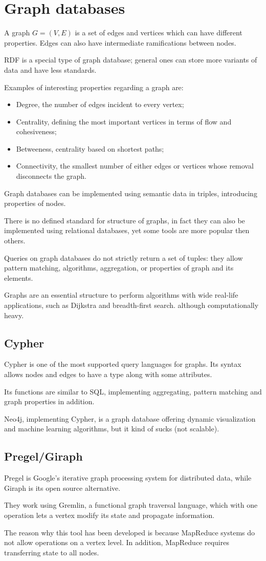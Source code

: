 \section{Graph databases}
A graph $G = (V, E)$ is a set of edges and vertices which can have different properties. Edges can also have intermediate ramifications between nodes.

RDF is a special type of graph database; general ones can store more variants of data and have less standards.

Examples of interesting properties regarding a graph are:
\begin{itemize}
	\item Degree, the number of edges incident to every vertex;
	\item Centrality, defining the most important vertices in terms of flow and cohesiveness;
	\item Betweeness, centrality based on shortest paths;
	\item Connectivity, the smallest number of either edges or vertices whose removal disconnects the graph.
\end{itemize}

Graph databases can be implemented using semantic data in triples, introducing properties of nodes.

There is no defined standard for structure of graphs, in fact they can also be implemented using relational databases, yet some tools are more popular then others. 

Queries on graph databases do not strictly return a set of tuples: they allow pattern matching, algorithms, aggregation, or properties of graph and its elements.

Graphs are an essential structure to perform algorithms with wide real-life applications, such as Dijkstra and breadth-first search. although computationally heavy.

\subsection{Cypher}
Cypher is one of the most supported query languages for graphs. Its syntax allows nodes and edges to have a type along with some attributes.

Its functions are similar to SQL, implementing aggregating, pattern matching and graph properties in addition.

Neo4j, implementing Cypher, is a graph database offering dynamic visualization and machine learning algorithms, but it kind of sucks (not scalable).

\subsection{Pregel/Giraph}
Pregel is Google's iterative graph processing system for distributed data, while Giraph is its open source alternative.

They work using Gremlin, a functional graph traversal language, which with one operation lets a vertex modify its state and propagate information.

The reason why this tool has been developed is because MapReduce systems do not allow operations on a vertex level. In addition, MapReduce requires transferring state to all nodes.
